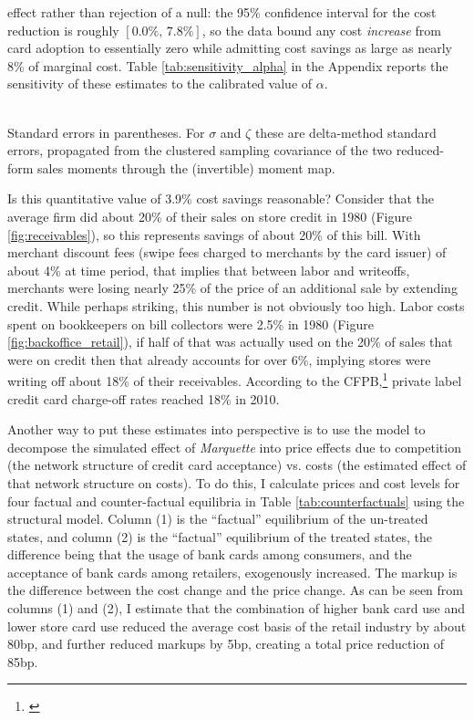 \documentclass[12pt,english]{article}
\begin{document}
effect rather than rejection of a null: the 95\% confidence interval for the cost reduction is roughly $[0.0\%,\,7.8\%]$, so the data bound any cost \emph{increase} from card adoption to essentially zero while admitting cost savings as large as nearly 8\% of marginal cost. Table \ref{tab:sensitivity_alpha} in the Appendix reports the sensitivity of these estimates to the calibrated value of $\alpha$.

\begin{table}[!htp]
\caption{Calibration Results}\label{tab:estimation_results}
    \centering
    
    \\[0.4em] \footnotesize Standard errors in parentheses. For $\sigma$ and $\zeta$ these are delta-method standard errors, propagated from the clustered sampling covariance of the two reduced-form sales moments through the (invertible) moment map.
\end{table}

Is this quantitative value of 3.9\% cost savings reasonable? Consider that the average firm did about 20\% of their sales on store credit in 1980 (Figure \ref{fig:receivables}), so this represents savings of about 20\% of this bill. With merchant discount fees (swipe fees charged to merchants by the card issuer) of about 4\% at time period, that implies that between labor and writeoffs, merchants were losing nearly 25\% of the price of an additional sale by extending credit. While perhaps striking, this number is not obviously too high. Labor costs spent on bookkeepers on bill collectors were 2.5\% in 1980 (Figure \ref{fig:backoffice_retail}), if half of that was actually used on the 20\% of sales that were on credit then that already accounts for over 6\%, implying stores were writing off about 18\% of their receivables. According to the CFPB,\footnote{\cite{consumer_financial_protection_bureau_credit_2022}} private label credit card charge-off rates reached 18\% in 2010. 

Another way to put these estimates into perspective is to use the model to decompose the simulated effect of \emph{Marquette} into price effects due to competition (the network structure of credit card acceptance) vs. costs (the estimated effect of that network structure on costs). To do this, I calculate prices and cost levels for four factual and counter-factual equilibria in Table \ref{tab:counterfactuals} using the structural model. Column (1) is the ``factual'' equilibrium of the un-treated states, and column (2) is the ``factual'' equilibrium of the treated states, the difference being that the usage of bank cards among consumers, and the acceptance of bank cards among retailers, exogenously increased. The markup is the difference between the cost change and the price change. As can be seen from columns (1) and (2), I estimate that the combination of higher bank card use and lower store card use reduced the average cost basis of the retail industry by about 80bp, and further reduced markups by 5bp, creating a total price reduction of 85bp.
\end{document}
